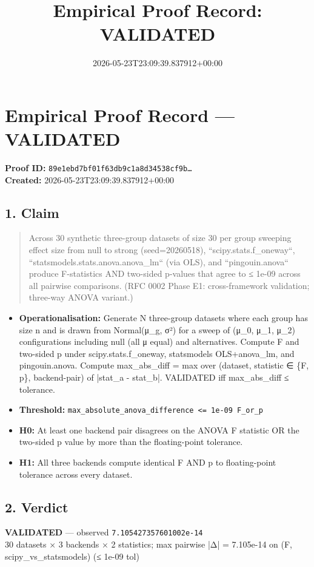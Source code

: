 \documentclass{article}
\title{Empirical Proof Record: VALIDATED}
\date{2026-05-23T23:09:39.837912+00:00}
\begin{document}
\maketitle
\section*{Empirical Proof Record --- \textcolor{validated}{\textbf{VALIDATED}}}
\textbf{Proof ID:} \texttt{89e1ebd7bf01f63db9c1a8d34538cf9b\dots}\\
\textbf{Created:} 2026-05-23T23:09:39.837912+00:00
\subsection*{1. Claim}
\begin{quote}Across 30 synthetic three-group datasets of size 30 per group sweeping effect size from null to strong (seed=20260518), ``scipy.stats.f\_oneway``, ``statsmodels.stats.anova.anova\_lm`` (via OLS), and ``pingouin.anova`` produce F-statistics AND two-sided p-values that agree to ≤ 1e-09 across all pairwise comparisons. (RFC 0002 Phase E1: cross-framework validation; three-way ANOVA variant.)\end{quote}
\begin{itemize}
\item \textbf{Operationalisation:} Generate N three-group datasets where each group has size n and is drawn from Normal(μ\_g, σ²) for a sweep of (μ\_0, μ\_1, μ\_2) configurations including null (all μ equal) and alternatives. Compute F and two-sided p under scipy.stats.f\_oneway, statsmodels OLS+anova\_lm, and pingouin.anova. Compute max\_abs\_diff = max over (dataset, statistic ∈ \{F, p\}, backend-pair) of |stat\_a - stat\_b|. VALIDATED iff max\_abs\_diff ≤ tolerance.
\item \textbf{Threshold:} \texttt{max\_absolute\_anova\_difference <= 1e-09 F\_or\_p}
\item \textbf{H0:} At least one backend pair disagrees on the ANOVA F statistic OR the two-sided p value by more than the floating-point tolerance.
\item \textbf{H1:} All three backends compute identical F AND p to floating-point tolerance across every dataset.
\end{itemize}
\subsection*{2. Verdict}
\textcolor{validated}{\textbf{VALIDATED}} --- observed \texttt{7.105427357601002e-14}\\
30 datasets × 3 backends × 2 statistics; max pairwise |Δ| = 7.105e-14 on (F, scipy\_vs\_statsmodels) (≤ 1e-09 tol)
\end{document}
